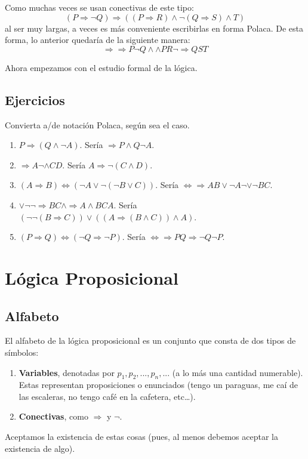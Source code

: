 \documentclass[12pt]{report}
\theoremstyle{largebreak}
\begin{document}
    Como muchas veces se usan conectivas de este tipo:
    \begin{equation*}
        (P\Rightarrow \neg Q)\Rightarrow((P\Rightarrow R)\land\neg(Q\Rightarrow S)\land T)
    \end{equation*}
    al ser muy largas, a veces es más conveniente escribirlas en forma Polaca. De esta forma, lo anterior quedaría de la siguiente manera:
    \begin{equation*}
        \Rightarrow\Rightarrow P\neg Q\land\land PR\neg\Rightarrow Q S T 
    \end{equation*}

    Ahora empezamos con el estudio formal de la lógica.

    \section{Ejercicios}

    Convierta a/de notación Polaca, según sea el caso.

    \begin{enumerate}
        \item $P\Rightarrow(Q\land\neg A)$. Sería $\Rightarrow P\land Q \neg A$.
        \item $\Rightarrow  A\neg\land CD$. Sería $A\Rightarrow \neg(C\land D)$.
        \item $(A\Rightarrow B)\iff (\neg A\lor \neg(\neg B\lor C))$. Sería $\iff \Rightarrow A B \lor \neg A \neg \lor \neg B C$.
        \item $\lor\neg\neg\Rightarrow B C\land\Rightarrow A\land BCA$. Sería $(\neg\neg(B\Rightarrow C))\lor((A\Rightarrow (B\land C))\land A)$.
        \item $(P\Rightarrow Q)\iff (\neg Q\Rightarrow\neg P)$. Sería $\iff \Rightarrow P Q \Rightarrow \neg Q \neg P$.
    \end{enumerate}

    \chapter{Lógica Proposicional}

    \section{Alfabeto}

    El alfabeto de la lógica proposicional es un conjunto que consta de dos tipos de símbolos:
    \begin{enumerate}
        \item \textbf{Variables}, denotadas por $p_1,p_2,...,p_n,...$ (a lo más una cantidad numerable). Estas representan proposiciones o enunciados (tengo un paraguas, me caí de las escaleras, no tengo café en la cafetera, etc\dots).
        \item \textbf{Conectivas}, como $\Rightarrow$ y $\neg$.
    \end{enumerate}
    Aceptamos la existencia de estas cosas (pues, al menos debemos aceptar la existencia de algo).
\end{document}
